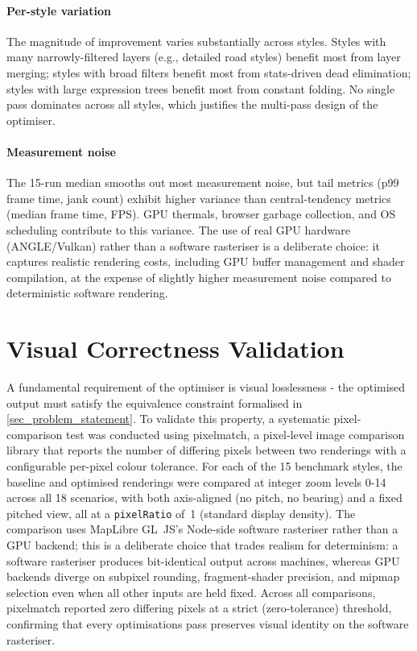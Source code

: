 \paragraph{Per-style variation}
The magnitude of improvement varies substantially across styles.
Styles with many narrowly-filtered layers (e.g., detailed road styles) benefit most from layer merging; styles with broad filters benefit most from stats-driven dead elimination; styles with large expression trees benefit most from constant folding.
No single pass dominates across all styles, which justifies the multi-pass design of the optimiser.

\paragraph{Measurement noise}
The 15-run median smooths out most measurement noise, but tail metrics (p99 frame time, jank count) exhibit higher variance than central-tendency metrics (median frame time, FPS).
GPU thermals, browser garbage collection, and OS scheduling contribute to this variance.
The use of real GPU hardware (ANGLE/Vulkan) rather than a software rasteriser is a deliberate choice: it captures realistic rendering costs, including GPU buffer management and shader compilation, at the expense of slightly higher measurement noise compared to deterministic software rendering.


\section{Visual Correctness Validation}\label{sec_visual_correctness}

A fundamental requirement of the optimiser is visual losslessness - the optimised output must satisfy the equivalence constraint formalised in \cref{sec_problem_statement}.
To validate this property, a systematic pixel-comparison test was conducted using pixelmatch, a pixel-level image comparison library that reports the number of differing pixels between two renderings with a configurable per-pixel colour tolerance.
For each of the 15 benchmark styles, the baseline and optimised renderings were compared at integer zoom levels 0-14 across all 18 scenarios, with both axis-aligned (no pitch, no bearing) and a fixed pitched view, all at a \texttt{pixelRatio} of~1 (standard display density).
The comparison uses MapLibre GL~JS's Node-side software rasteriser rather than a GPU backend; this is a deliberate choice that trades realism for determinism: a software rasteriser produces bit-identical output across machines, whereas GPU backends diverge on subpixel rounding, fragment-shader precision, and mipmap selection even when all other inputs are held fixed.
Across all comparisons, pixelmatch reported zero differing pixels at a strict (zero-tolerance) threshold, confirming that every optimisations pass preserves visual identity on the software rasteriser.

